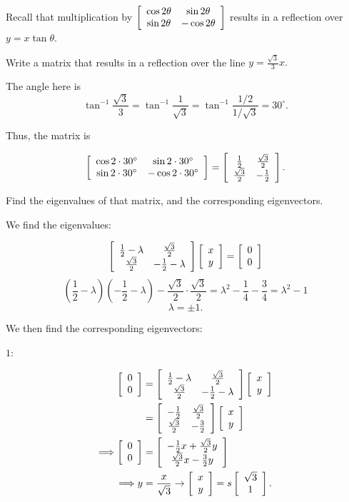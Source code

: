 \documentclass[../key.tex]{subfiles}
\begin{document}
\begin{outer_problem}
\item Recall that multiplication by $\left[\begin{array}{cc} \cos 2\theta & \sin 2\theta \\ \sin 2\theta & -\cos 2\theta \end{array}\right]$ results in a reflection over $y=x\tan \theta$.
\end{outer_problem}

\begin{inner_problem}[start=1]
\item Write a matrix that results in a reflection over the line $y=\frac{\sqrt{3}}{3}x.$
\end{inner_problem}

The angle here is $$\tan^{-1} \frac{\sqrt{3}}{3} = \tan^{-1} \frac{1}{\sqrt{3}} = \tan^{-1} \frac{1/2}{1/\sqrt{3}} = 30^\circ.$$

Thus, the matrix is

$$\left[\begin{array}{cc} \cos 2\cdot 30^\circ & \sin 2\cdot 30^\circ \\ \sin 2\cdot 30^\circ & -\cos 2\cdot 30^\circ \end{array}\right] = \left[\begin{array}{cc} \frac{1}{2} & \frac{\sqrt{3}}{2} \\ \frac{\sqrt{3}}{2} & -\frac{1}{2} \end{array}\right].$$

\begin{inner_problem}
\item Find the eigenvalues of that matrix, and the corresponding eigenvectors.
\end{inner_problem}

We find the eigenvalues:

$$\left[\begin{array}{cc} \frac{1}{2}-\lambda & \frac{\sqrt{3}}{2} \\ \frac{\sqrt{3}}{2} & -\frac{1}{2}-\lambda \end{array}\right]\left[\begin{array}{c} x \\ y \end{array}\right]=\left[\begin{array}{c} 0 \\ 0 \end{array}\right]$$
$$\left(\frac{1}{2}-\lambda \right)\left(-\frac{1}{2}-\lambda\right) - \frac{\sqrt{3}}{2}\cdot \frac{\sqrt{3}}{2} = \lambda^2 - \frac{1}{4} - \frac{3}{4} = \lambda^2-1$$
$$\lambda = \pm 1.$$

We then find the corresponding eigenvectors:

$1$:

\begin{align*}
\left[\begin{array}{c} 0 \\ 0 \end{array}\right] &= \left[\begin{array}{cc} \frac{1}{2}-\lambda & \frac{\sqrt{3}}{2} \\ \frac{\sqrt{3}}{2} & -\frac{1}{2}-\lambda \end{array}\right]\left[\begin{array}{c} x \\ y \end{array}\right] \\
&= \left[\begin{array}{cc} -\frac{1}{2} & \frac{\sqrt{3}}{2} \\ \frac{\sqrt{3}}{2} & -\frac{3}{2} \end{array}\right]\left[\begin{array}{c} x \\ y \end{array}\right] \\
\Longrightarrow \left[\begin{array}{c} 0 \\ 0 \end{array}\right] &= \left[\begin{array}{c} -\frac{1}{2}x+\frac{\sqrt{3}}{2}y \\ \frac{\sqrt{3}}{2}x-\frac{3}{2}y \end{array}\right] \\
\Longrightarrow y&=\frac{x}{\sqrt{3}} \rightarrow \left[\begin{array}{c} x \\ y \end{array}\right]=s\left[\begin{array}{c} \sqrt{3} \\ 1 \end{array}\right].
\end{align*}
\end{document}
